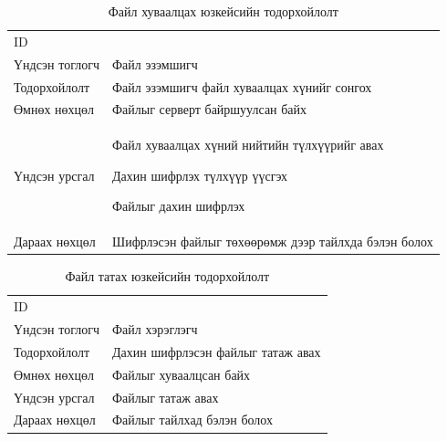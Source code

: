 \begin{table}
    \label{tab:treatments}
    \footnotesize
    \centering
    \begin{tabularx}{\textwidth}{|>{\hsize=0.3\hsize}X|>{\hsize=0.7\hsize}X|}
        \hline
        \multicolumn{2}{|c|}{Файл хуваалцах} \\
        \hline
        ID & 5 \\
        \hline
        Үндсэн тоглогч & Файл эзэмшигч\\
        \hline
        Тодорхойлолт & Файл эзэмшигч файл хуваалцах хүнийг сонгох\\
        \hline
        Өмнөх нөхцөл & Файлыг серверт байршуулсан байх\\
        \hline
        Үндсэн урсгал &
            \item Файл хуваалцах хүний нийтийн түлхүүрийг авах
            \item Дахин шифрлэх түлхүүр үүсгэх
            \item Файлыг дахин шифрлэх\\
        \hline
        Дараах нөхцөл & Шифрлэсэн файлыг төхөөрөмж дээр тайлхда бэлэн болох\\
        \hline
    \end{tabularx}
    \caption{Файл хуваалцах юзкейсийн тодорхойлолт}
\end{table}

\begin{table}
    \label{tab:treatments}
    \footnotesize
    \centering
    \begin{tabularx}{\textwidth}{|>{\hsize=0.3\hsize}X|>{\hsize=0.7\hsize}X|}
        \hline
        \multicolumn{2}{|c|}{Файл татах} \\
        \hline
        ID & 6 \\
        \hline
        Үндсэн тоглогч & Файл хэрэглэгч\\
        \hline
        Тодорхойлолт & Дахин шифрлэсэн файлыг татаж авах\\
        \hline
        Өмнөх нөхцөл & Файлыг хуваалцсан байх\\
        \hline
        Үндсэн урсгал & Файлыг татаж авах\\
        \hline
        Дараах нөхцөл & Файлыг тайлхад бэлэн болох\\
        \hline
    \end{tabularx}
    \caption{Файл татах юзкейсийн тодорхойлолт}
\end{table}

